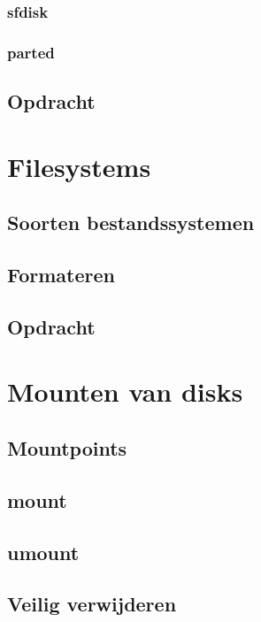 \documentclass[a4paper,12pt,twoside,openright,titlepage]{book}
\begin{document}
\subsection{sfdisk}

\subsection{parted}

\section{Opdracht}


\chapter{Filesystems}

\section{Soorten bestandssystemen}

\section{Formateren}

\section{Opdracht}


\chapter{Mounten van disks}

\section{Mountpoints}



\section{mount}

\section{umount}

\section{Veilig verwijderen}

\end{document}
